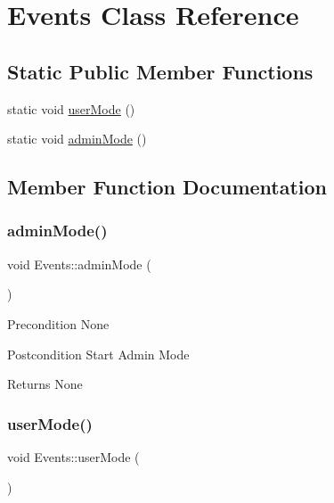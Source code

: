 \hypertarget{class_events}{}\section{Events Class Reference}
\label{class_events}
\subsection*{Static Public Member Functions}
\begin{DoxyCompactItemize}
\item 
static void \mbox{\hyperlink{class_events_a2fdb7c40bf64aa2e23d3d92dc7ab4d35}{user\+Mode}} ()
\item 
static void \mbox{\hyperlink{class_events_a2217e32868e367ec8d432ce9db2b450e}{admin\+Mode}} ()
\end{DoxyCompactItemize}


\subsection{Member Function Documentation}
\mbox{\label{class_events_a2217e32868e367ec8d432ce9db2b450e}} 
\subsubsection{\texorpdfstring{admin\+Mode()}{adminMode()}}
{\footnotesize\ttfamily void Events\+::admin\+Mode (\begin{DoxyParamCaption}{ }\end{DoxyParamCaption})\hspace{0.3cm}{\ttfamily [static]}}

\begin{DoxyPrecond}{Precondition}
None 
\end{DoxyPrecond}
\begin{DoxyPostcond}{Postcondition}
Start Admin Mode 
\end{DoxyPostcond}
\begin{DoxyReturn}{Returns}
None 
\end{DoxyReturn}
\mbox{\label{class_events_a2fdb7c40bf64aa2e23d3d92dc7ab4d35}} 
\subsubsection{\texorpdfstring{user\+Mode()}{userMode()}}
{\footnotesize\ttfamily void Events\+::user\+Mode (\begin{DoxyParamCaption}{ }\end{DoxyParamCaption})\hspace{0.3cm}{\ttfamily [static]}}

